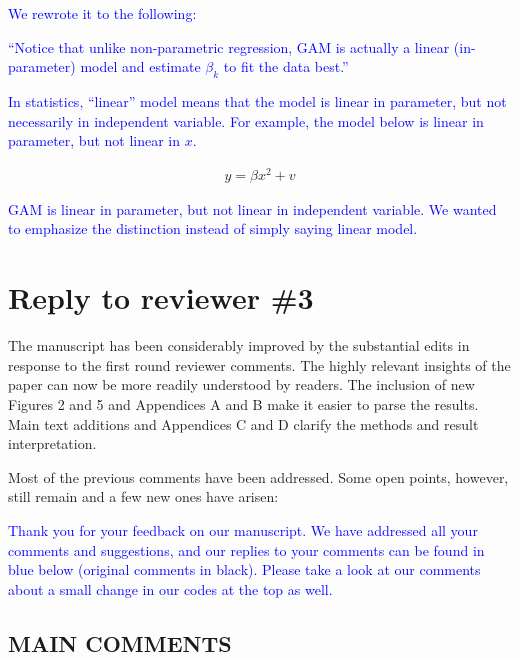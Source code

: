 \documentclass[
]{article}
\begin{document}
\begin{itemize}
\textcolor{blue}{We rewrote it to the following:}

\textcolor{blue}{``Notice that unlike non-parametric regression, GAM is actually a linear (in-parameter) model and estimate $\beta_k$ to fit the data best.''}

\textcolor{blue}{In statistics, ``linear'' model means that the model is linear in parameter, but not necessarily in independent variable. For example, the model below is linear in parameter, but not linear in $x$.} 

\begin{align}
  y = \beta x^2 + v
\end{align}  

\textcolor{blue}{ GAM is linear in parameter, but not linear in independent variable. We wanted to emphasize the distinction instead of simply saying linear model.} 

\end{itemize}

\section{Reply to reviewer \#3}

The manuscript has been considerably improved by the substantial edits in response to the first round reviewer comments. The highly relevant insights of the paper can now be more readily understood by readers. The inclusion of new Figures 2 and 5 and Appendices A and B make it easier to parse the results. Main text additions and Appendices C and D clarify the methods and result interpretation.

Most of the previous comments have been addressed. Some open points, however, still remain and a few new ones have arisen:

\textcolor{blue}{Thank you for your feedback on our manuscript. We have addressed all your comments and suggestions, and our replies to your comments can be found in blue below (original comments in black). Please take a look at our comments about a small change in our codes at the top as well.}

\subsection{MAIN COMMENTS}
\end{document}
